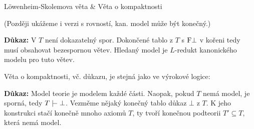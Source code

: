 \documentclass{beamer}
\begin{document}
\begin{frame}{Löwenheim-Skolemova věta \& Věta o kompaktnosti}
    
    \medskip
    
    \pause

    \pause
    (Později ukážeme i verzi s rovností, kan. model může být konečný.)

    \pause
    \textbf{Důkaz:} V $T$ není dokazatelný spor. Dokončené tablo z $T$ s $\mathrm{F}\bot$ v kořeni tedy musí obsahovat bezespornou větev. Hledaný model je $L$-redukt kanonického modelu pro tuto větev.\hfill\qedsymbol

    \bigskip

    \pause
    Věta o kompaktnosti, vč. důkazu, je stejná jako ve výrokové logice:

    \pause
    \smallskip
    
    \pause
    \textbf{Důkaz:} Model teorie je modelem každé části. Naopak, pokud $T$ nemá model, je sporná, tedy $T\proves\bot$. Vezměme nějaký \alert{konečný} tablo důkaz $\bot$ z $T$. K jeho konstrukci stačí konečně mnoho axiomů $T$, ty tvoří konečnou podteorii $T'\subseteq T$, která nemá model.\hfill\qedsymbol

\end{frame}
\end{document}
